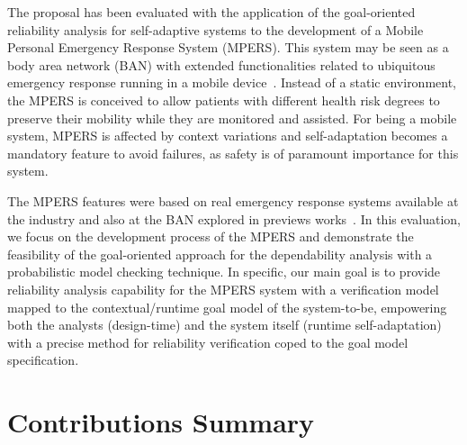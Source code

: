 The proposal has been evaluated with the application of the goal-oriented reliability analysis for self-adaptive systems to the development of a Mobile Personal Emergency Response System (MPERS). This system may be seen as a body area network (BAN) with extended functionalities related to ubiquitous emergency response running in a mobile device~\cite{Lorincz2004, MPERS:GoSafe}. Instead of a static environment, the MPERS is conceived to allow patients with different health risk degrees to preserve their mobility while they are monitored and assisted. For being a mobile system, MPERS is affected by context variations and self-adaptation becomes a mandatory feature to avoid failures, as safety is of paramount importance for this system.

The MPERS features were based on real emergency response systems available at the industry and also at the BAN explored in previews works~\cite{Nunes:2012, MPERS:GoSafe}. In this evaluation, we focus on the development process of the MPERS and demonstrate the feasibility of the goal-oriented approach for the dependability analysis with a probabilistic model checking technique. In specific, our main goal is to provide reliability analysis capability for the MPERS system with a verification model mapped to the contextual/runtime goal model of the system-to-be, empowering both the analysts (design-time) and the system itself (runtime self-adaptation) with a precise method for reliability verification coped to the goal model specification.



\section{Contributions Summary}

